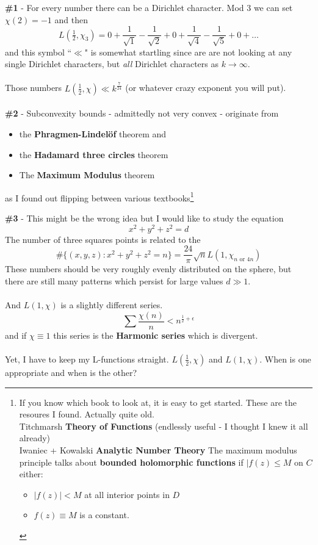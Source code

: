 \documentclass[12pt]{article}
\begin{document}
\newpage

\noindent  \textbf{\#1} - For every number there can be a Dirichlet character.  Mod 3 we can set $\chi(2)=-1$ and then
$$ L(\tfrac{1}{2}, \chi_3) = 
0+
\frac{1}{\sqrt{1}} - 
 \frac{1}{\sqrt{2}} +
 0 + 
\frac{1}{\sqrt{4}} - 
 \frac{1}{\sqrt{5}} +
 0 + \dots 
$$
and this symbol ``$\ll$" is somewhat startling since are are not looking at any single Dirichlet characters, but \textit{all} Dirichlet characters as $k \to \infty$.  \\ \\
Those numbers $L(\frac{1}{2}, \chi) \ll k^\frac{7}{24}$ (or whatever crazy exponent you will put). \\ \\
\noindent  \textbf{\#2} - Subconvexity bounds - admittedly not very convex - originate from 
\begin{itemize}
\item the \textbf{Phragmen-Lindel\"{o}f} theorem and
\item the \textbf{Hadamard three circles} theorem 
\item The \textbf{Maximum Modulus} theorem
\end{itemize}
as I found out flipping between various textbooks\footnote{If you know which book to look at, it is easy to get started.  These are the resoures I found.  Actually quite old. \\ Titchmarsh \textbf{Theory of Functions} (endlessly useful - I thought I knew it all already)  \\ Iwaniec + Kowalski \textbf{Analytic Number Theory} The maximum modulus principle talks about \textbf{bounded holomorphic functions} if $|f(z) \leq M$ on $C$ either:\begin{itemize}
\item $|f(z)|< M$ at all interior points in $D$
\item $f(z)\equiv M$ is a constant.
\end{itemize}  }

\newpage

\noindent \textbf{\#3} - This might be the wrong idea but I would like to study the equation 
$$ x^2 + y^2 + z^2 = d $$
The number of three squares points is related to the 
$$ \# \big\{ (x,y,z): x^2 + y^2 + z^2 = n \big\}
=  \frac{24}{\pi} \sqrt{n} L (1, \chi_{n \text{ or }4n})$$
These numbers should be very roughly evenly distributed on the sphere, but there are still many patterns which persist for large values $d \gg 1$. \\ \\
And $L(1, \chi)$ is a slightly different series.  
$$ \sum \frac{\chi(n)}{n} < n^{\frac{1}{2} + \epsilon} $$
and if $\chi \equiv 1$ this series is the \textbf{Harmonic series} which is divergent.  \\ \\
Yet, I have to keep my L-functions straight.  $L(\frac{1}{2}, \chi)$ and $L(1, \chi)$.  When is one appropriate and when is the other?
\end{document}
